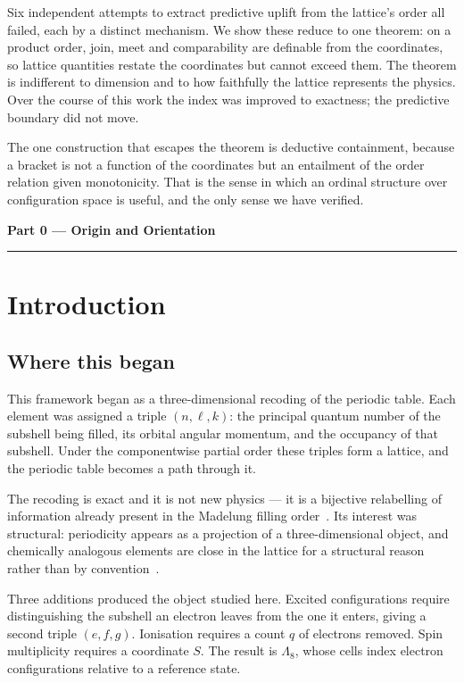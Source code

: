 \documentclass[11pt,a4paper]{article}
\newcommand{\parttitle}[1]{%
  \vspace{1.2\baselineskip}%
  {\noindent\LARGE\bfseries\color{acc} #1\par}%
  \vspace{0.4\baselineskip}\noindent\textcolor{acc}{\rule{\linewidth}{0.8pt}}%
  \vspace{0.6\baselineskip}\par}
\theoremstyle{definition}
\newcommand{\Le}{\ensuremath{\Lambda_{8}}}
\begin{document}
Six independent attempts to extract predictive uplift from the lattice's order
all failed, each by a distinct mechanism. We show these reduce to one theorem:
on a product order, join, meet and comparability are definable from the
coordinates, so lattice quantities restate the coordinates but cannot exceed
them. The theorem is indifferent to dimension and to how faithfully the lattice
represents the physics. Over the course of this work the index was improved to
exactness; the predictive boundary did not move.

The one construction that escapes the theorem is deductive containment, because
a bracket is not a function of the coordinates but an entailment of the order
relation given monotonicity. That is the sense in which an ordinal structure
over configuration space is useful, and the only sense we have verified.
\normalsize

\parttitle{Part 0 --- Origin and Orientation}

\section{Introduction}

\subsection{Where this began}
This framework began as a three-dimensional recoding of the periodic table. Each
element was assigned a triple $(n,\ell,k)$: the principal quantum number of the
subshell being filled, its orbital angular momentum, and the occupancy of that
subshell. Under the componentwise partial order these triples form a lattice,
and the periodic table becomes a path through it.

The recoding is exact and it is not new physics --- it is a bijective
relabelling of information already present in the Madelung filling
order~\cite{madelung,klechkowski}. Its interest was structural: periodicity
appears as a projection of a three-dimensional object, and chemically analogous
elements are close in the lattice for a structural reason rather than by
convention~\cite{scerri,ostrovsky}.

Three additions produced the object studied here. Excited configurations require
distinguishing the subshell an electron leaves from the one it enters, giving a
second triple $(e,f,g)$. Ionisation requires a count $q$ of electrons removed.
Spin multiplicity requires a coordinate $S$. The result is \Le{}, whose cells
index electron configurations relative to a reference state.
\end{document}
